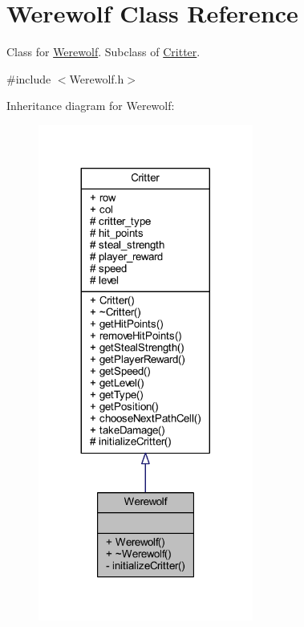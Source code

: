 \hypertarget{class_werewolf}{\section{Werewolf Class Reference}
\label{class_werewolf}
}


Class for \hyperlink{class_werewolf}{Werewolf}. Subclass of \hyperlink{class_critter}{Critter}.  




{\ttfamily \#include $<$Werewolf.\+h$>$}



Inheritance diagram for Werewolf\+:
\nopagebreak
\begin{figure}[H]
\begin{center}
\leavevmode
\includegraphics[width=200pt]{class_werewolf__inherit__graph}
\end{center}
\end{figure}



